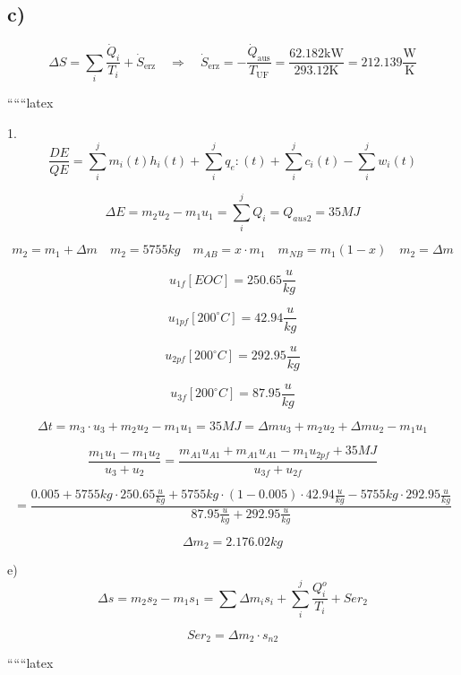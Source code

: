 \subsection*{c)}

\begin{equation*}
\Delta S = \sum_{i} \frac{\dot{Q}_i}{T_i} + \dot{S}_{\text{erz}} \quad \Rightarrow \quad \dot{S}_{\text{erz}} = - \frac{\dot{Q}_{\text{aus}}}{T_{\text{UF}}} = \frac{62.182 \text{kW}}{293.12 \text{K}} = 212.139 \frac{\text{W}}{\text{K}}
\end{equation*}

``````latex

1. 
\[
\frac{DE}{QE} = \sum_i^j m_i(t) h_i(t) + \sum_i^j q_e:(t) + \sum_i^j c_i(t) - \sum_i^j w_i(t)
\]

\[
\Delta E = m_2 u_2 - m_1 u_1 = \sum_i^j Q_i = Q_{aus2} = 35MJ
\]

\[
m_2 = m_1 + \Delta m \quad m_2 = 5755kg \quad m_{AB} = x \cdot m_1 \quad m_{NB} = m_1 (1 - x) \quad m_2 = \Delta m
\]

\[
u_{1f} [EOC] = 250.65 \frac{u}{kg}
\]

\[
u_{1pf} [200^\circ C] = 42.94 \frac{u}{kg}
\]

\[
u_{2pf} [200^\circ C] = 292.95 \frac{u}{kg}
\]

\[
u_{3f} [200^\circ C] = 87.95 \frac{u}{kg}
\]

\[
\Delta t = m_3 \cdot u_3 + m_2 u_2 - m_1 u_1 = 35MJ = \Delta m u_3 + m_2 u_2 + \Delta m u_2 - m_1 u_1
\]

\[
\frac{m_1 u_1 - m_1 u_2}{u_3 + u_2} = \frac{m_{A1} u_{A1} + m_{A1} u_{A1} - m_1 u_{2pf} + 35MJ}{u_{3f} + u_{2f}}
\]

\[
= \frac{0.005 + 5755kg \cdot 250.65 \frac{u}{kg} + 5755kg \cdot (1 - 0.005) \cdot 42.94 \frac{u}{kg} - 5755kg \cdot 292.95 \frac{u}{kg}}{87.95 \frac{u}{kg} + 292.95 \frac{u}{kg}}
\]

\[
\Delta m_2 = 2.176.02kg
\]

e)
\[
\Delta s = m_2 s_2 - m_1 s_1 = \sum \Delta m_i s_i + \sum_i^j \frac{Q_i^o}{T_i} + Ser_2
\]

\[
Ser_2 = \Delta m_2 \cdot s_{n2}
\]

``````latex


